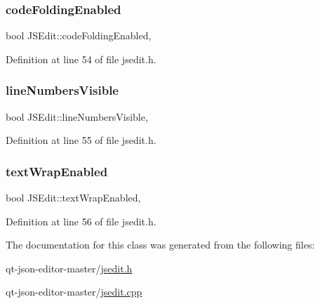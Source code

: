 \mbox{\label{class_j_s_edit_a1442cc5f36a78e5a26e1a88d6b78033d}} 
\subsubsection{\texorpdfstring{code\+Folding\+Enabled}{codeFoldingEnabled}}
{\footnotesize\ttfamily bool J\+S\+Edit\+::code\+Folding\+Enabled\hspace{0.3cm}{\ttfamily [read]}, {\ttfamily [write]}}



Definition at line 54 of file jsedit.\+h.

\mbox{\label{class_j_s_edit_a5a9f728fcf999d5ff0ef5e3d315d269d}} 
\subsubsection{\texorpdfstring{line\+Numbers\+Visible}{lineNumbersVisible}}
{\footnotesize\ttfamily bool J\+S\+Edit\+::line\+Numbers\+Visible\hspace{0.3cm}{\ttfamily [read]}, {\ttfamily [write]}}



Definition at line 55 of file jsedit.\+h.

\mbox{\label{class_j_s_edit_afb27dea3fe4766b77f9f4f2e1c489e56}} 
\subsubsection{\texorpdfstring{text\+Wrap\+Enabled}{textWrapEnabled}}
{\footnotesize\ttfamily bool J\+S\+Edit\+::text\+Wrap\+Enabled\hspace{0.3cm}{\ttfamily [read]}, {\ttfamily [write]}}



Definition at line 56 of file jsedit.\+h.



The documentation for this class was generated from the following files\+:\begin{DoxyCompactItemize}
\item 
qt-\/json-\/editor-\/master/\hyperlink{jsedit_8h}{jsedit.\+h}\item 
qt-\/json-\/editor-\/master/\hyperlink{jsedit_8cpp}{jsedit.\+cpp}\end{DoxyCompactItemize}
